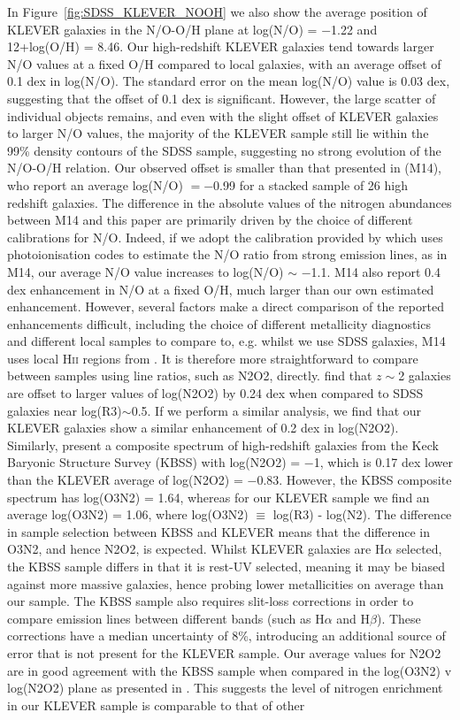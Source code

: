 \documentclass[usenatbib]{mnras} %
\begin{document}
In Figure~\ref{fig:SDSS_KLEVER_NOOH} we also show the average position of KLEVER galaxies in the N/O-O/H plane at log(N/O) = $-$1.22 and 12+log(O/H) = 8.46. Our high-redshift KLEVER galaxies tend towards larger N/O values at a fixed O/H compared to local galaxies, with an average offset of 0.1 dex in log(N/O). The standard error on the mean log(N/O) value is 0.03 dex, suggesting that the offset of 0.1 dex is significant. However, the large scatter of individual objects remains, and even with the slight offset of KLEVER galaxies to larger N/O values, the majority of the KLEVER sample still lie within the 99\% density contours of the SDSS sample, suggesting no strong evolution of the N/O-O/H relation. Our observed offset is smaller than that presented in \cite{Masters_2014} (M14), who report an average log(N/O) $= -$0.99 for a stacked sample of 26 high redshift galaxies. The difference in the absolute values of the nitrogen abundances between M14 and this paper are primarily driven by the choice of different calibrations for N/O. Indeed, if we adopt the calibration provided by \cite{Thurston_1996} which uses photoionisation codes to estimate the N/O ratio from strong emission lines, as in M14, our average N/O value increases to log(N/O) $\sim$ $-$1.1. M14 also report 0.4 dex enhancement in N/O at a fixed O/H, much larger than our own estimated enhancement. However, several factors make a direct comparison of the reported enhancements difficult, including the choice of different metallicity diagnostics and different local samples to compare to, e.g. whilst we use SDSS galaxies, M14 uses local \textsc{Hii} regions from \cite{vanZee_1998}. It is therefore more straightforward to compare between samples using line ratios, such as N2O2, directly. \cite{Shapley_2015} find that $z\sim$2 galaxies are offset to larger values of log(N2O2) by 0.24 dex when compared to SDSS galaxies near log(R3)$\sim$0.5. If we perform a similar analysis, we find that our KLEVER galaxies show a similar enhancement of 0.2 dex in log(N2O2). Similarly, \cite{Steidel_2016} present a composite spectrum of high-redshift galaxies from the Keck Baryonic Structure Survey (KBSS) with log(N2O2) = $-$1, which is 0.17 dex lower than the KLEVER average of log(N2O2) = $-$0.83. However,  the KBSS composite spectrum has log(O3N2) = 1.64, whereas for our KLEVER sample we find an average log(O3N2) = 1.06, where log(O3N2) $\equiv$ log(R3) - log(N2). The difference in sample selection between KBSS and KLEVER means that the difference in O3N2, and hence N2O2, is expected. Whilst KLEVER galaxies are H$\alpha$ selected, the KBSS sample differs in that it is rest-UV selected, meaning it may be biased against more massive galaxies, hence probing lower metallicities on average than our sample. The KBSS sample also requires slit-loss corrections in order to compare emission lines between different bands (such as H$\alpha$ and H$\beta$). These corrections have a median uncertainty of 8\%, introducing an additional source of error that is not present for the KLEVER sample. Our average values for N2O2 are in good agreement with the KBSS sample when compared in the log(O3N2) v log(N2O2) plane as presented in \cite{Strom_2017}. This suggests the level of nitrogen enrichment in our KLEVER sample is comparable to that of other 
\end{document}

